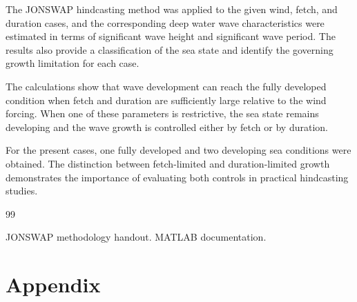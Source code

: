 \documentclass[a4paper, 11pt]{article}
\begin{document}
\hspace{0.5cm}The JONSWAP hindcasting method was applied to the given wind, fetch, and duration cases, and the corresponding deep water wave characteristics were estimated in terms of significant wave height and significant wave period. The results also provide a classification of the sea state and identify the governing growth limitation for each case.

The calculations show that wave development can reach the fully developed condition when fetch and duration are sufficiently large relative to the wind forcing. When one of these parameters is restrictive, the sea state remains developing and the wave growth is controlled either by fetch or by duration.

For the present cases, one fully developed and two developing sea conditions were obtained. The distinction between fetch-limited and duration-limited growth demonstrates the importance of evaluating both controls in practical hindcasting studies.
\newpage

\begin{thebibliography}{99}

 JONSWAP methodology handout.
 MATLAB documentation.

\end{thebibliography}
\newpage

\appendix
\section{Appendix}
\end{document}
